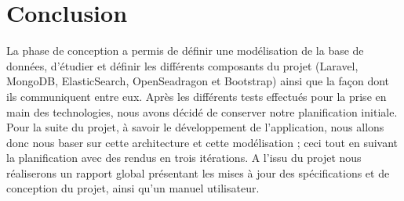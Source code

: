 \section{Conclusion}
\label{sec:conc}

	La phase de conception a permis de définir une modélisation de la base de données, d'étudier et définir les différents composants du projet (Laravel, MongoDB, ElasticSearch, OpenSeadragon et Bootstrap) ainsi que la façon dont ils communiquent entre eux. Après les différents tests effectués pour la prise en main des technologies, nous avons décidé de conserver notre planification initiale.
	Pour la suite du projet, à savoir le développement de l'application, nous allons donc nous baser sur cette architecture et cette modélisation ; ceci tout en suivant la planification avec des rendus en trois itérations.
	A l'issu du projet nous réaliserons un rapport global présentant les mises à jour des spécifications et de conception du projet, ainsi qu'un manuel utilisateur.





